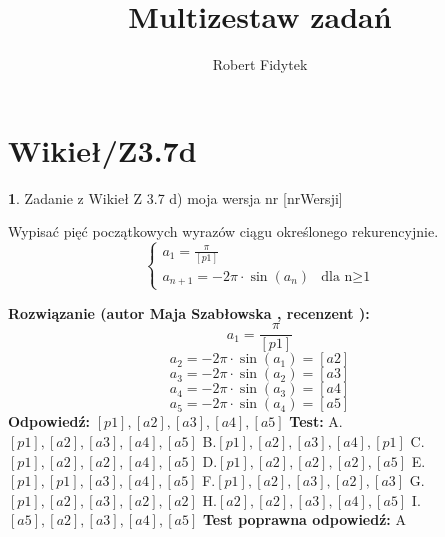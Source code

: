 \documentclass[12pt, a4paper]{article}
\title{Multizestaw zadań}
\author{Robert Fidytek}
\date{}
\theoremstyle{definition} %
\newtheorem{zad}{}
\newcommand{\kategoria}[1]{\section{#1}} %
\newcommand{\zadStart}[1]{\begin{zad}#1\newline} %
\newcommand{\zadStop}{\end{zad}}   %
\newcommand{\rozwStart}[2]{\noindent \textbf{Rozwiązanie (autor #1 , recenzent #2): }\newline} %
\newcommand{\rozwStop}{\newline}                                            %
\newcommand{\odpStart}{\noindent \textbf{Odpowiedź:}\newline}    %
\newcommand{\odpStop}{\newline}                                             %
\newcommand{\testStart}{\noindent \textbf{Test:}\newline} %
\newcommand{\testStop}{\newline} %
\newcommand{\kluczStart}{\noindent \textbf{Test poprawna odpowiedź:}\newline} %
\newcommand{\kluczStop}{\newline} %
\begin{document}
\maketitle


\kategoria{Wikieł/Z3.7d}
\zadStart{Zadanie z Wikieł Z 3.7 d)  moja wersja nr [nrWersji]}

Wypisać pięć początkowych wyrazów ciągu określonego rekurencyjnie.
$$\left\{ \begin{array}{ll}
a_{1}=\frac{\pi}{[p1]}\\
a_{n+1}=-2\pi\cdot \sin(a_{n})& \textrm{dla n$\geq$1} 
\end{array} \right.
$$
\zadStop
\rozwStart{Maja Szabłowska}{}
$$a_{1}=\frac{\pi}{[p1]}$$
$$a_{2}=-2\pi\cdot\sin(a_{1})=[a2]$$
$$a_{3}=-2\pi\cdot\sin(a_{2})=[a3]$$
$$a_{4}=-2\pi\cdot\sin(a_{3})=[a4]$$
$$a_{5}=-2\pi\cdot\sin(a_{4})=[a5]$$
\rozwStop
\odpStart
$[p1],[a2],[a3],[a4],[a5]$
\odpStop
\testStart
A.$[p1],[a2],[a3],[a4],[a5]$
B.$[p1],[a2],[a3],[a4],[p1]$
C.$[p1],[a2],[a2],[a4],[a5]$
D.$[p1],[a2],[a2],[a2],[a5]$
E.$[p1],[p1],[a3],[a4],[a5]$
F.$[p1],[a2],[a3],[a2],[a3]$
G.$[p1],[a2],[a3],[a2],[a2]$
H.$[a2],[a2],[a3],[a4],[a5]$
I.$[a5],[a2],[a3],[a4],[a5]$
\testStop
\kluczStart
A
\kluczStop
\end{document}

